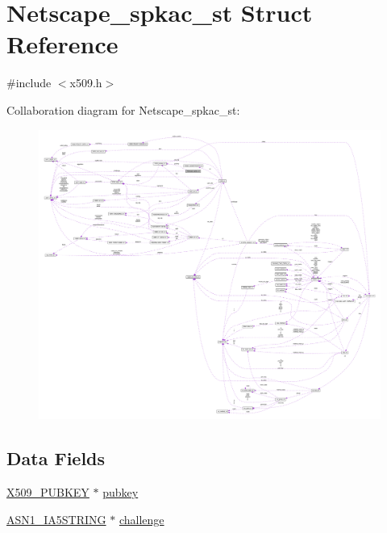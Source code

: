 \hypertarget{struct_netscape__spkac__st}{}\section{Netscape\+\_\+spkac\+\_\+st Struct Reference}
\label{struct_netscape__spkac__st}


{\ttfamily \#include $<$x509.\+h$>$}



Collaboration diagram for Netscape\+\_\+spkac\+\_\+st\+:\nopagebreak
\begin{figure}[H]
\begin{center}
\leavevmode
\includegraphics[width=350pt]{struct_netscape__spkac__st__coll__graph}
\end{center}
\end{figure}
\subsection*{Data Fields}
\begin{DoxyCompactItemize}
\item 
\hyperlink{crypto_2ossl__typ_8h_a9183376ae13a86ca35c75edf5412b914}{X509\+\_\+\+P\+U\+B\+K\+EY} $\ast$ \hyperlink{struct_netscape__spkac__st_a7b1b003230ee0d158404d0ff7a4d120c}{pubkey}
\item 
\hyperlink{crypto_2ossl__typ_8h_a0d915c339a64c1c9871d5404e51c44fd}{A\+S\+N1\+\_\+\+I\+A5\+S\+T\+R\+I\+NG} $\ast$ \hyperlink{struct_netscape__spkac__st_a77dda55d9604b00dde3fb4091be4fcaf}{challenge}
\end{DoxyCompactItemize}


